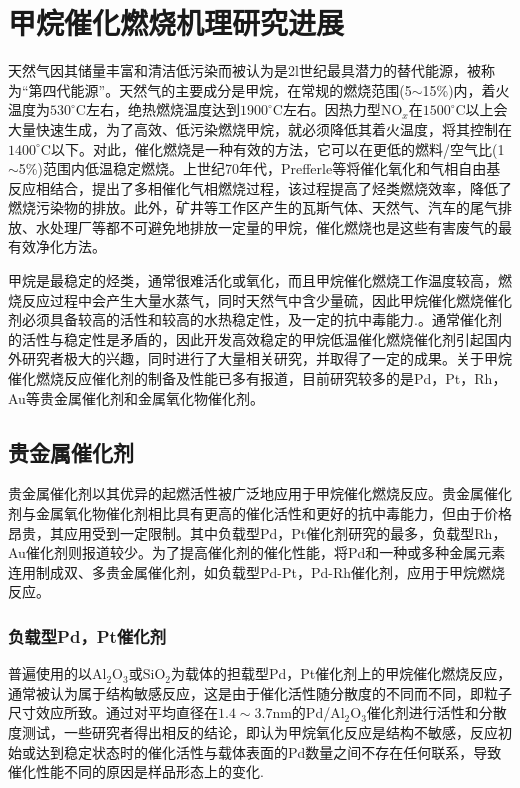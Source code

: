 \chapter{甲烷催化燃烧机理研究进展}
天然气因其储量丰富和清洁低污染而被认为是2l世纪最具潜力的替代能源，被称为“第四代能源”。天然气的主要成分是甲烷，在常规的燃烧范围(5$\sim$15\%)内，着火温度为$530^{\circ}\mathrm{C}$左右，绝热燃烧温度达到$1900^{\circ}\mathrm{C}$左右。因热力型$\mathrm{NO}_x$在$1500^{\circ}\mathrm{C}$以上会大量快速生成，为了高效、低污染燃烧甲烷，就必须降低其着火温度，将其控制在$1400^{\circ}\mathrm{C}$以下。对此，催化燃烧是一种有效的方法，它可以在更低的燃料/空气比(1$\sim$5\%)范围内低温稳定燃烧。上世纪70年代，\textrm{Prefferle}等将催化氧化和气相自由基反应相结合，提出了多相催化气相燃烧过程，该过程提高了烃类燃烧效率，降低了燃烧污染物的排放\cite{ProcChem15-242_2003}。此外，矿井等工作区产生的瓦斯气体、天然气、汽车的尾气排放、水处理厂等都不可避免地排放一定量的甲烷，催化燃烧也是这些有害废气的最有效净化方法。\cite{ChemOL66-715_2003}

甲烷是最稳定的烃类，通常很难活化或氧化，而且甲烷催化燃烧工作温度较高，燃烧反应过程中会产生大量水蒸气，同时天然气中含少量硫，因此甲烷催化燃烧催化剂必须具备较高的活性和较高的水热稳定性，及一定的抗中毒能力.。通常催化剂的活性与稳定性是矛盾的，因此开发高效稳定的甲烷低温催化燃烧催化剂引起国内外研究者极大的兴趣，同时进行了大量相关研究，并取得了一定的成果。关于甲烷催化燃烧反应催化剂的制备及性能已多有报道，目前研究较多的是\textrm{Pd}，\textrm{Pt}，\textrm{Rh}，\textrm{Au}等贵金属催化剂和金属氧化物催化剂。

\section{贵金属催化剂}
贵金属催化剂以其优异的起燃活性被广泛地应用于甲烷催化燃烧反应。贵金属催化剂与金属氧化物催化剂相比具有更高的催化活性和更好的抗中毒能力，但由于价格昂贵，其应用受到一定限制。其中负载型\textrm{Pd}，\textrm{Pt}催化剂研究的最多，负载型\textrm{Rh}，\textrm{Au}催化剂则报道较少。为了提高催化剂的催化性能，将\textrm{Pd}和一种或多种金属元素连用制成双、多贵金属催化剂，如负载型\textrm{Pd-Pt}，\textrm{Pd-Rh}催化剂，应用于甲烷燃烧反应。

\subsection{负载型\rm{Pd}，\rm{Pt}催化剂}
普遍使用的以$\mathrm{Al}_2\mathrm{O}_3$或$\mathrm{SiO}_2$为载体的担载型\textrm{Pd}，\textrm{Pt}催化剂上的甲烷催化燃烧反应，通常被认为属于结构敏感反应\cite{CataT47-245_1999}，这是由于催化活性随分散度的不同而不同，即粒子尺寸效应所致。通过对平均直径在$1.4\sim3.7$\textrm{nm}的\textrm{Pd}/$\mathrm{Al}_2\mathrm{O}_3$催化剂进行活性和分散度测试，一些研究者得出相反的结论，即认为甲烷氧化反应是结构不敏感\cite{ACB5-149_1994}，反应初始或达到稳定状态时的催化活性与载体表面的\textrm{Pd}数量之间不存在任何联系，导致催化性能不同的原因是样品形态上的变化.


